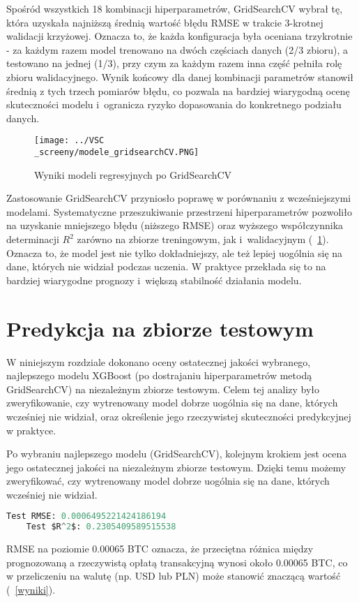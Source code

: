 \documentclass[12pt,a4paper]{report}
\theoremstyle{definition} %
\begin{document}
	Spośród wszystkich 18 kombinacji hiperparametrów, GridSearchCV wybrał tę, która uzyskała najniższą średnią wartość błędu RMSE w trakcie 3-krotnej walidacji krzyżowej. Oznacza to, że każda konfiguracja była oceniana trzykrotnie - za każdym razem model trenowano na dwóch częściach danych (2/3 zbioru), a testowano na jednej (1/3), przy czym za każdym razem inna część pełniła rolę zbioru walidacyjnego. Wynik końcowy dla danej kombinacji parametrów stanowił średnią z tych trzech pomiarów błędu, co pozwala na bardziej wiarygodną ocenę skuteczności modelu i~ogranicza ryzyko dopasowania do konkretnego podziału danych.

	\begin{figure}[H]
	    \centering
	    \texttt{[image: ../VSC\\\_screeny/modele\_gridsearchCV.PNG]} 
	    \caption{Wyniki modeli regresyjnych po GridSearchCV}
	    \label{fig:wynikiGridSearchCV}
	\end{figure}
	
	Zastosowanie GridSearchCV przyniosło poprawę w porównaniu z wcześniejszymi modelami. Systematyczne przeszukiwanie przestrzeni hiperparametrów pozwoliło na uzyskanie mniejszego błędu (niższego RMSE) oraz wyższego współczynnika determinacji $R^2$ zarówno na zbiorze treningowym, jak i~walidacyjnym (\figurename~\ref{fig:wynikiGridSearchCV}). Oznacza to, że model jest nie tylko dokładniejszy, ale też lepiej uogólnia się na dane, których nie widział podczas uczenia. W praktyce przekłada się to na bardziej wiarygodne prognozy i~większą stabilność działania modelu.

	\section{Predykcja na zbiorze testowym}
	\hspace*{\parindent}W niniejszym rozdziale dokonano oceny ostatecznej jakości wybranego, najlepszego modelu XGBoost (po dostrajaniu hiperparametrów metodą GridSearchCV) na niezależnym zbiorze testowym. Celem tej analizy było zweryfikowanie, czy wytrenowany model dobrze uogólnia się na dane, których wcześniej nie widział, oraz określenie jego rzeczywistej skuteczności predykcyjnej w praktyce.

Po wybraniu najlepszego modelu (GridSearchCV), kolejnym krokiem jest ocena jego ostatecznej jakości na niezależnym zbiorze testowym. Dzięki temu możemy zweryfikować, czy wytrenowany model dobrze uogólnia się na dane, których wcześniej nie widział.
	\begin{lstlisting}[language=Python,mathescape=true,caption=Wyniki predykcji na zbiorze testowym, label=wyniki]
	Test RMSE: 0.0006495221424186194
	Test $R^2$: 0.2305409589515538
	\end{lstlisting}
	RMSE na poziomie 0.00065 BTC oznacza, że przeciętna różnica między prognozowaną a rzeczywistą opłatą transakcyjną wynosi około 0.00065 BTC, co w przeliczeniu na walutę (np. USD lub PLN) może stanowić znaczącą wartość (\lstlistingname~\ref{wyniki}).
\end{document}
